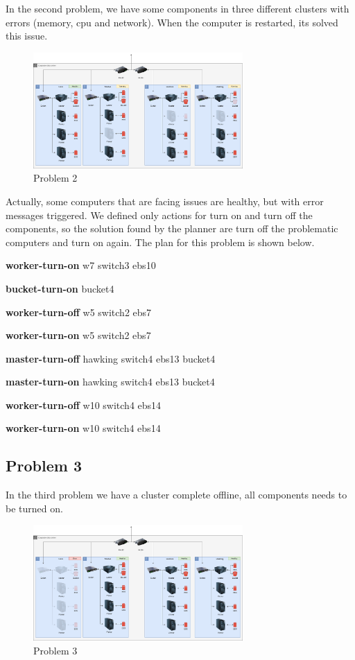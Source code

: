 \documentclass[letterpaper]{article}
\begin{document}
In the second problem, we have some components in three different clusters with errors (memory, cpu and network). When the computer is restarted, its solved this issue.

\begin{figure}[ht]
    \centering
    \includegraphics[width=8cm]{images/diagrams-pb2.png}
    \caption{Problem 2}
    \label{fig:data-center-pb2}
\end{figure}

Actually, some computers that are facing issues are healthy, but with error messages triggered. We defined only actions for turn on and turn off the components, so the solution found by the planner are turn off the problematic computers and turn on again. The plan for this problem is shown below.

\textbf{worker-turn-on} w7 switch3 ebs10 

\textbf{bucket-turn-on} bucket4 

\textbf{worker-turn-off} w5 switch2 ebs7 

\textbf{worker-turn-on} w5 switch2 ebs7 

\textbf{master-turn-off} hawking switch4 ebs13 bucket4 

\textbf{master-turn-on} hawking switch4 ebs13 bucket4 

\textbf{worker-turn-off} w10 switch4 ebs14 

\textbf{worker-turn-on} w10 switch4 ebs14

\subsection{Problem 3}\label{sec:experiments3}

In the third problem we have a cluster complete offline, all components needs to be turned on.

\begin{figure}[ht]
    \centering
    \includegraphics[width=8cm]{images/diagrams-pb3.png}
    \caption{Problem 3}
    \label{fig:data-center-pb3}
\end{figure}
\end{document}
